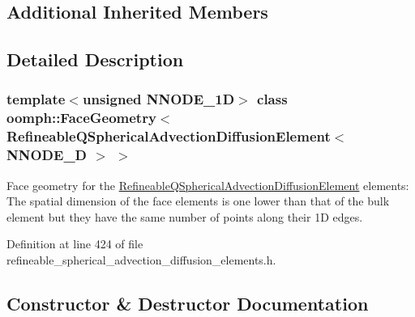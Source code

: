 \subsection*{Additional Inherited Members}


\subsection{Detailed Description}
\subsubsection*{template$<$unsigned N\+N\+O\+D\+E\+\_\+1D$>$\newline
class oomph\+::\+Face\+Geometry$<$ Refineable\+Q\+Spherical\+Advection\+Diffusion\+Element$<$ N\+N\+O\+D\+E\+\_\+D $>$ $>$}

Face geometry for the \hyperlink{classoomph_1_1RefineableQSphericalAdvectionDiffusionElement}{Refineable\+Q\+Spherical\+Advection\+Diffusion\+Element} elements\+: The spatial dimension of the face elements is one lower than that of the bulk element but they have the same number of points along their 1D edges. 

Definition at line 424 of file refineable\+\_\+spherical\+\_\+advection\+\_\+diffusion\+\_\+elements.\+h.



\subsection{Constructor \& Destructor Documentation}
\mbox{\label{classoomph_1_1FaceGeometry_3_01RefineableQSphericalAdvectionDiffusionElement_3_01NNODE__1D_01_4_01_4_ae09a56009d883c69047f1c1e8f0b7b8a}} 

